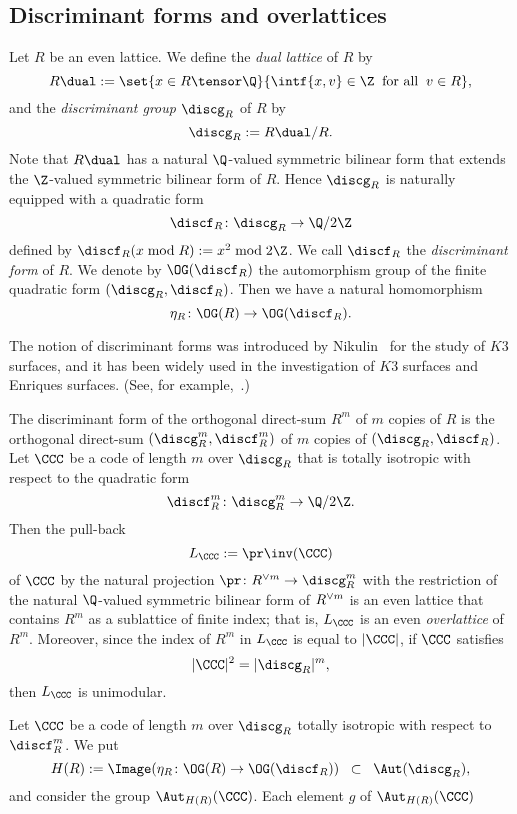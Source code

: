 \documentclass{amsart}
\begin{document}
\subsection{Discriminant forms and overlattices}\label{subsec:overlattice}
%
Let $R$ be an even lattice.
We define the \emph{dual lattice} of $R$ by 
$$
R\dual:=\set{x\in R\tensor \Q}{\intf{x, v}\in \Z\;\;\textrm{for all}\;\; v\in R},
$$
and the \emph{discriminant group} $\discg_R$ of $R$  by
$$
\discg_R:=R\dual/R.
$$
Note that $R\dual$ has a natural $\Q$-valued symmetric bilinear form
that extends the $\Z$-valued symmetric bilinear form of $R$.
Hence $\discg_R$ is naturally equipped with a  quadratic form 
$$
\discf_R\colon \discg_R\to \Q/2\Z
$$
defined by $\discf_R(x \bmod R):=x^2 \bmod 2\Z$.
We call $\discf_R$  the \emph{discriminant form} of $R$.
We denote by $\OG(\discf_R)$ the automorphism group 
of the finite quadratic form $(\discg_R, \discf_R)$.
Then we have a natural homomorphism
$$
\eta_R\colon \OG(R)\to \OG(\discf_R).
$$
%
\begin{remark}
The notion of discriminant forms  was introduced by Nikulin~\cite{Nik}
for the study of $K3$ surfaces,
and it has been widely used in
the investigation of $K3$ surfaces and Enriques surfaces. (See, for example,~\cite{Shi}.)
\end{remark}
%
The discriminant form of the orthogonal direct-sum $R^m$ of $m$ copies of $R$
is the orthogonal direct-sum $(\discg_R^m, \discf_R^m)$ of $m$ copies of $(\discg_R, \discf_R)$.
Let $\CCC$ be a code of length $m$ over $\discg_R$
that is totally isotropic with respect to the quadratic form 
$$
\discf_R^m\colon \discg_R^m\to \Q/2\Z.
$$
Then the pull-back 
%
\begin{equation}\label{eq:LCCC}
L_{\CCC}:=\pr\inv (\CCC)
\end{equation}
%
of $\CCC$ by the natural projection $\pr\colon R\sp{\vee m}\to \discg_R^m$
with the restriction of the natural $\Q$-valued symmetric bilinear form of $R\sp{\vee m}$
is an even lattice that contains $R^m$ as a sublattice of finite index;
that is, $L_{\CCC}$ is an even \emph{overlattice} of $R^m$.
Moreover, since the index of $R^m$ in $L_{\CCC}$ is equal to $|\CCC|$,
if $\CCC$ satisfies 
$$
|\CCC|^2=|\discg_R|^m,
$$ 
then $L_{\CCC}$ is unimodular.
\par
Let $\CCC$ be a code of length $m$ over $\discg_R$
totally isotropic with respect to $\discf_R^m$.
We put
$$
H(R):=\Image(\eta_R\colon \OG(R)\to \OG(\discf_R))\;\;\subset \;\; \Aut(\discg_R),
$$
and consider the  group $\Aut_{H(R)}(\CCC)$.
Each element $g$ of $\Aut_{H(R)}(\CCC)$ 
\end{document}
